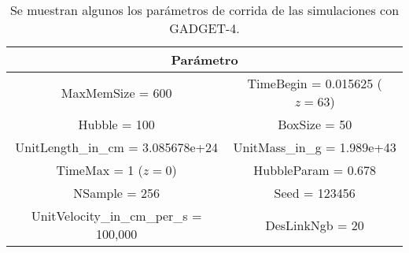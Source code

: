 \begin{table}[H]
    \begin{tabular}{|c|c|}
    \hline
    \multicolumn{2}{|c|}{\textbf{Parámetro}} \\ \hline
    MaxMemSize = 600 & TimeBegin = 0.015625 ($z=63$) \\ \hline
    Hubble = 100 & BoxSize = 50 \\ \hline
    UnitLength\_in\_cm = 3.085678e+24 & UnitMass\_in\_g = 1.989e+43 \\ \hline
    TimeMax = 1 ($z=0$) & HubbleParam = 0.678 \\ \hline
    NSample = 256 & Seed = 123456 \\ \hline
    UnitVelocity\_in\_cm\_per\_s = 100,000 & DesLinkNgb = 20 \\ \hline
    \end{tabular}
    \caption{Se muestran algunos los parámetros de corrida de las simulaciones con GADGET-4.}
    \label{tab:Corrida-Gadget-4}
\end{table}